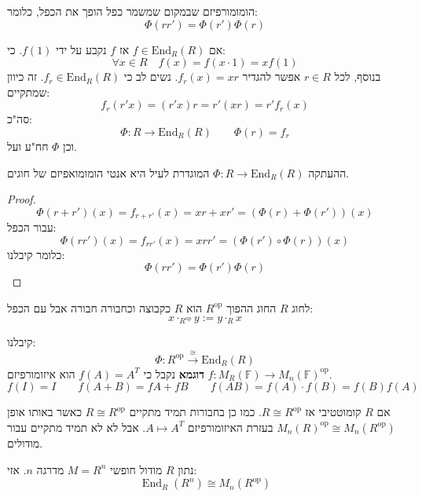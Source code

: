 \documentclass{tstextbook}
\begin{document}
\begin{definition}
הומומורפיזם שבמקום שמשמר כפל הופך את הכפל, כלומר:
$$\Phi(rr')=\Phi(r')\Phi(r)$$

\end{definition}
\begin{reminder}
אם \(f \in \mathrm{End}_{R}(R)\) אז \(f\) נקבע על ידי \(f(1)\). כי:
$$\forall x \in R\quad f(x)=f(x\cdot 1)=xf(1)$$
בנוסף, לכל \(r \in R\) אפשר להגדיר \(f_{r}(x)=xr\). נשים לב כי \(f_{r}\in \mathrm{End}_{R}(R)\). זה כיוון שמתקיים:
$$f_{r}(r'x)=(r'x)r=r'(xr)=r'f_{r}(x)$$
סה"כ:
$$\Phi:R\to \mathrm{End}_{R}(R)\qquad \Phi(r)=f_{r}$$
וכן \(\Phi\) חח"ע ועל.

\end{reminder}
\begin{proposition}
ההעתקה \(\Phi:R\to \mathrm{End}_{R}(R)\) המוגדרת לעיל היא אנטי הומומואפיזם של חוגים.

\end{proposition}
\begin{proof}
$$\Phi(r+r')(x)=f_{r+r'}(x)=xr+xr'=(\Phi(r)+\Phi(r'))(x)$$
עבור הכפל:
$$\Phi(rr')(x)=f_{rr'}(x)=xrr'=(\Phi(r')\circ  \Phi(r))(x)$$
כלומר קיבלנו:
$$\Phi(rr')=\Phi(r')\Phi(r)$$

\end{proof}
\begin{definition}
לחוג \(R\) החוג ההפוך \(R^{\text{op}}\) הוא \(R\) כקבוצה וכחבורה חבורה אבל עם הכפל:
$$x\cdot_{R^{\mathrm{op}}}y := y\cdot_{R} x$$

\end{definition}
\begin{corollary}
קיבלנו:
$$\Phi:R^{\text{op}}\xrightarrow{\cong }\mathrm{End}_{R}(R)$$\textbf{דוגמא}
נקבל כי \(f(A)=A^{T}\) הוא איזומורפיזם \(f:M_{R}(\mathbb{F})\to M_{n}(\mathbb{F})^{\mathrm{op}}\).
$$f(I)=I\qquad f(A+B)=fA+fB\qquad f(AB)=f(A)\cdot f(B)=f(B)f(A)$$

\end{corollary}
\begin{remark}
אם \(R\) קומוטטיבי אז \(R\cong R^{\text{op}}\). כמו כן בחבורות תמיד מתקיים \(R\cong R^{\text{op}}\) כאשר באותו אופן \(M_{n}(R)^{\text{op}}\cong M_{n}(R^{\text{op}})\) בעזרת האיזומורפיזם \(A\mapsto A^{T}\). אבל לא לא תמיד מתקיים עבור מודולים.

\end{remark}
\begin{proposition}
נתון \(R\) מודול חופשי \(M=R^{n}\) מדרגה \(n\). אזי:
$$\operatorname{End}_{R}(R^{n})\cong M_{n}(R^{\mathrm{op}})$$

\end{proposition}
\end{document}
